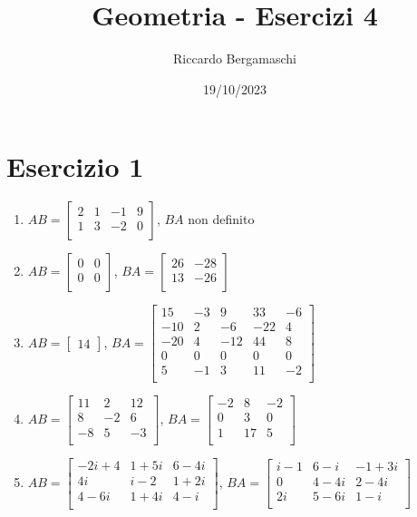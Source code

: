 \documentclass{article}
\title{Geometria - Esercizi 4}
\author{Riccardo Bergamaschi}
\date{19/10/2023}
\begin{document}
\maketitle
\section*{Esercizio 1}
\begin{enumerate}
    \item $AB=\begin{bmatrix}
        2 & 1 & -1 & 9 \\
        1 & 3 & -2 & 0 \\
    \end{bmatrix}$, $BA$ non definito
    \item $AB=\begin{bmatrix}
        0 & 0 \\
        0 & 0 \\
    \end{bmatrix}$, $BA=\begin{bmatrix}
        26 & -28 \\
        13 & -26 \\
    \end{bmatrix}$
    \item $AB=\begin{bmatrix}14\end{bmatrix}$, $BA=\begin{bmatrix}
        15 & -3 & 9 & 33 & -6 \\
        -10 & 2 & -6 & -22 & 4 \\
        -20 & 4 & -12 & 44 & 8 \\
        0 & 0 & 0 & 0 & 0 \\
        5 & -1 & 3 & 11 & -2 \\
    \end{bmatrix}$
    \item $AB=\begin{bmatrix}
        11 & 2 & 12 \\
        8 & -2 & 6 \\
        -8 & 5 & -3 \\
    \end{bmatrix}$, $BA=\begin{bmatrix}
        -2 & 8 & -2 \\
        0 & 3 & 0 \\
        1 & 17 & 5 \\
    \end{bmatrix}$
    \item $AB=\begin{bmatrix}
        -2i+4 & 1+5i & 6-4i \\
        4i & i-2 & 1+2i \\
        4-6i & 1+4i & 4-i \\
    \end{bmatrix}$, $BA=\begin{bmatrix}
        i-1 & 6-i & -1+3i \\
        0 & 4-4i & 2-4i \\
        2i & 5-6i & 1-i \\
    \end{bmatrix}$
\end{enumerate}
\end{document}
